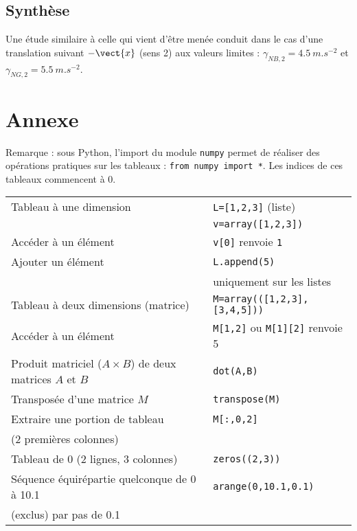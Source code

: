 \subsection{Synthèse}

Une étude similaire à celle qui vient d’être menée conduit dans le cas d’une translation suivant $-\vect{x}$
(sens 2) aux valeurs limites : $\gamma_{NB,2} = \SI{4,5}{m.s^{-2}}$ 
et $\gamma_{NG,2} = \SI{5,5}{m.s^{-2}}$.



\section{Annexe}
Remarque : sous Python, l’import du module \lstinline{numpy} permet de réaliser des opérations pratiques sur les tableaux : \lstinline{from numpy import *}. Les indices de ces tableaux commencent à 0.

\begin{center}
\begin{tabular}{ll}
\hline
Tableau à une dimension 	&  \texttt{L=[1,2,3]} (liste) \\
				& \texttt{v=array([1,2,3])} \\
\hline
Accéder à un élément 		& \texttt{v[0]} renvoie \texttt{1} \\
\hline
Ajouter un élément 		& \texttt{L.append(5)} \\
				& uniquement sur les listes \\
\hline
Tableau à deux dimensions (matrice) & \texttt{M=array(([1,2,3],[3,4,5]))} \\
\hline
Accéder à un élément 		& \texttt{M[1,2]} ou \texttt{M[1][2]} renvoie 5 \\
\hline
Produit matriciel ($A\times B$) de deux matrices $A$ et $B$  
				& \texttt{dot(A,B)} \\
\hline
Transposée d’une matrice $M$ 	& \texttt{transpose(M)} \\
\hline
Extraire une portion de tableau 	& \texttt{M[:,0,2]} \\
(2 premières colonnes) 		& 			\\
\hline
Tableau de 0 (2 lignes, 3 colonnes) & \texttt{zeros((2,3))} \\
\hline
Séquence équirépartie quelconque de 0 à 10.1 & \texttt{arange(0,10.1,0.1)}\\
(exclus) par pas de 0.1 & \\
\hline
\end{tabular}
\end{center}
